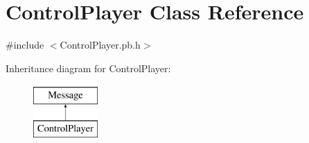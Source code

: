 \hypertarget{class_control_player}{\section{Control\-Player Class Reference}
\label{class_control_player}
}


{\ttfamily \#include $<$Control\-Player.\-pb.\-h$>$}

Inheritance diagram for Control\-Player\-:\begin{figure}[H]
\begin{center}
\leavevmode
\includegraphics[height=2.000000cm]{class_control_player}
\end{center}
\end{figure}
